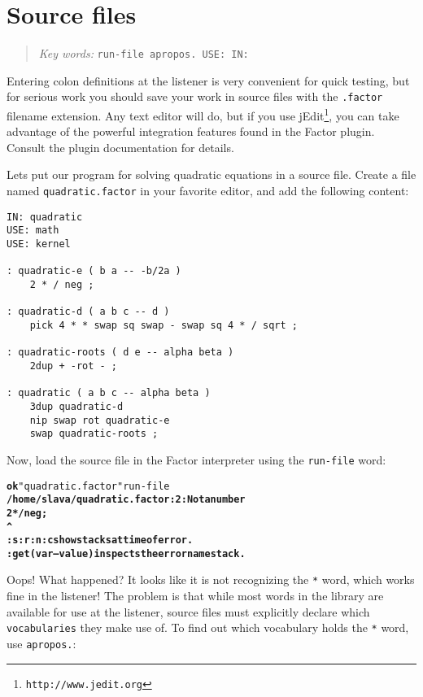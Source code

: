 \documentclass[english]{book}
\newcommand{\chapkeywords}[1]{%
\begin{quote}
\emph{Key words:} \texttt{#1}
\end{quote}
}
\begin{document}
\section{Source files}

\chapkeywords{run-file apropos.~USE: IN:}

Entering colon definitions at the listener is very convenient for quick testing, but for serious work you should save your work in source files with the \texttt{.factor} filename extension. Any text editor will do, but if you use jEdit\footnote{\texttt{http://www.jedit.org}}, you can take advantage of the powerful integration features found in the Factor plugin. Consult the plugin documentation for details.

Lets put our program for solving quadratic equations in a source file. Create a file named \texttt{quadratic.factor} in your favorite editor, and add the following content:

\begin{verbatim}
IN: quadratic
USE: math
USE: kernel

: quadratic-e ( b a -- -b/2a )
    2 * / neg ;

: quadratic-d ( a b c -- d )
    pick 4 * * swap sq swap - swap sq 4 * / sqrt ;

: quadratic-roots ( d e -- alpha beta )
    2dup + -rot - ;

: quadratic ( a b c -- alpha beta )
    3dup quadratic-d
    nip swap rot quadratic-e
    swap quadratic-roots ;
\end{verbatim}

Now, load the source file in the Factor interpreter using the \texttt{run-file} word:

\begin{alltt}
\textbf{ok} "quadratic.factor" run-file
\textbf{/home/slava/quadratic.factor:2: Not a number
    2 * / neg ;
       ^
:s :r :n :c show stacks at time of error.
:get ( var -- value ) inspects the error namestack.}
\end{alltt}

Oops! What happened? It looks like it is not recognizing the \texttt{*} word, which works fine in the listener! The problem is that while most words in the library are available for use at the listener, source files must explicitly declare which \texttt{vocabularies} they make use of. To find out which vocabulary holds the \texttt{*} word, use \texttt{apropos.}:
\end{document}
